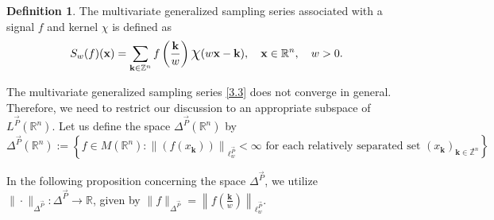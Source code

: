 \documentclass[11pt, a4paper]{article}
\theoremstyle{definition}
\newtheorem{defin}[thm]{Definition}
\numberwithin{equation}{section}
\def\ZZ{\mathbb Z}
\def\RR{\mathbb R}
\def\Chi{\mbox{\Large$\chi$}}
\newcommand{\vc}[1]{\overrightarrow{#1}}
\begin{document}
\begin{defin}
 The multivariate generalized sampling series associated with a signal $f$ and kernel $\chi$ is defined as
\begin{equation} \label{3.3}
    S_{w}(f)(\textbf{x})=\sum_{\textbf{k}\in \ZZ^n}f\left(\frac{\textbf{k}}{w}\right)\Chi(w\textbf{x}-\textbf{k}), \quad \textbf{x} \in \RR^n, \quad  w>0.
\end{equation}
\end{defin}
The multivariate generalized sampling series \eqref{3.3} does not converge in general.  Therefore, we need to restrict our discussion to an appropriate subspace of $L^{\overrightarrow{P}}(\RR^n)$. Let us define the space $\Delta^{\vc{P}}(\RR^n)$ by
\begin{equation*}
    \Delta^{\vc{P}}(\RR^n):=\left\lbrace  f\in M(\RR^n): \left\lVert(f(x_{\textbf{k}}))\right\rVert_{\ell^{\vc{P}}_w} <\infty \text{ for each relatively separated set } (x_{\textbf{k}})_{\textbf{k} \in \ZZ^n} \right\rbrace.
\end{equation*}


In the following proposition concerning the space $\Delta^{\vc{P}}$, we utilize $\|\cdot\|_{\Delta^{\vc{P}}} :\Delta^{\vc{P}} \rightarrow \RR$, given by $\|f\|_{\Delta^{\vc{P}}} = \left\|f \left( \frac{\textbf{k}}{w}\right) \right\|_{\ell^{\overrightarrow P}_w}$. 
\end{document}
